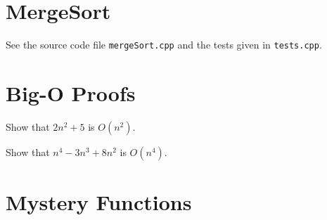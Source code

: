 \documentclass{article}
\begin{document}
    \section{MergeSort}

    See the source code file \texttt{mergeSort.cpp} and the tests given in
    \texttt{tests.cpp}.

    \section{Big-O Proofs}

    \vspace{2mm}
     Show that $2n^2+5$ is $O(n^2)$.


    \vspace{1cm}
     Show that $n^4 - 3n^3 + 8n^2$ is $O(n^4)$.


    \vspace{1cm}
    \section{Mystery Functions}


\end{document}
